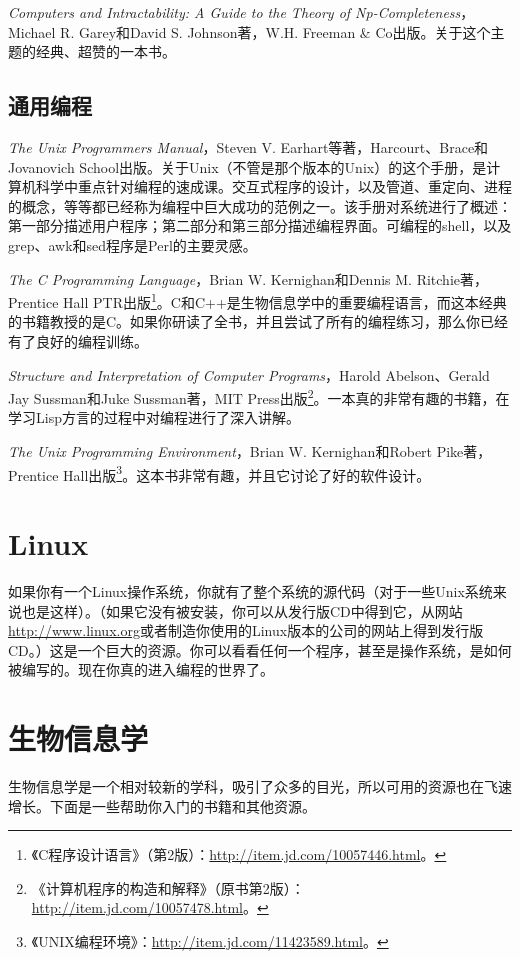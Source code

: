 \textit{Computers and Intractability: A Guide to the Theory of Np-Completeness}，Michael R. Garey和David S. Johnson著，W.H. Freeman \& Co出版。关于这个主题的经典、超赞的一本书。

\subsection{通用编程}
\textit{The Unix Programmers Manual}，Steven V.  Earhart等著，Harcourt、Brace和Jovanovich School出版。关于Unix（不管是那个版本的Unix）的这个手册，是计算机科学中重点针对编程的速成课。交互式程序的设计，以及管道、重定向、进程的概念，等等都已经称为编程中巨大成功的范例之一。该手册对系统进行了概述：第一部分描述用户程序；第二部分和第三部分描述编程界面。可编程的shell，以及grep、awk和sed程序是Perl的主要灵感。

\textit{The C Programming Language}，Brian W. Kernighan和Dennis M.  Ritchie著，Prentice Hall PTR出版\footnote{《C程序设计语言》（第2版）：\href{http://item.jd.com/10057446.html}{http://item.jd.com/10057446.html}。}。C和C++是生物信息学中的重要编程语言，而这本经典的书籍教授的是C。如果你研读了全书，并且尝试了所有的编程练习，那么你已经有了良好的编程训练。

\textit{Structure and Interpretation of Computer Programs}，Harold Abelson、Gerald Jay Sussman和Juke Sussman著，MIT Press出版\footnote{《计算机程序的构造和解释》（原书第2版）：\href{http://item.jd.com/10057478.html}{http://item.jd.com/10057478.html}。}。一本真的非常有趣的书籍，在学习Lisp方言的过程中对编程进行了深入讲解。

\textit{The Unix Programming Environment}，Brian W. Kernighan和Robert Pike著，Prentice Hall出版\footnote{《UNIX编程环境》：\href{http://item.jd.com/11423589.html}{http://item.jd.com/11423589.html}。}。这本书非常有趣，并且它讨论了好的软件设计。

\section{Linux}
如果你有一个Linux操作系统，你就有了整个系统的源代码（对于一些Unix系统来说也是这样）。（如果它没有被安装，你可以从发行版CD中得到它，从网站\href{http://www.linux.org}{http://www.linux.org}或者制造你使用的Linux版本的公司的网站上得到发行版CD。）这是一个巨大的资源。你可以看看任何一个程序，甚至是操作系统，是如何被编写的。现在你真的进入编程的世界了。

\section{生物信息学}
生物信息学是一个相对较新的学科，吸引了众多的目光，所以可用的资源也在飞速增长。下面是一些帮助你入门的书籍和其他资源。

